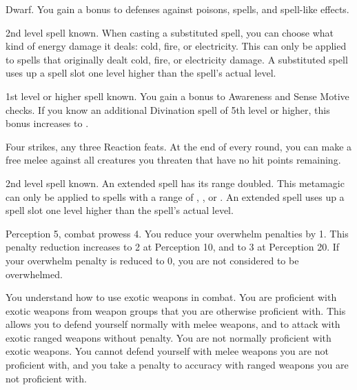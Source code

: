 \featpre Dwarf.
\featben You gain a  bonus to defenses against poisons, spells, and spell-like effects.

\featpre 2nd level spell known.
\featben When casting a substituted spell, you can choose what kind of energy damage it deals: cold, fire, or electricity.
This can only be applied to spells that originally dealt cold, fire, or electricity damage.
A substituted spell uses up a spell slot one level higher than the spell's actual level.

\featpre 1st level or higher  spell known.
\featben You gain a  bonus to Awareness and Sense Motive checks.
If you know an additional Divination spell of 5th level or higher, this bonus increases to .

\featpres Four strikes, any three Reaction feats.
\featben At the end of every round, you can make a free melee  against all creatures you threaten that have no hit points remaining.

\featpre 2nd level spell known.
\featben An extended spell has its range doubled.
This metamagic can only be applied to spells with a range of \rngclose, \rngmed, or \rnglong.
An extended spell uses up a spell slot one level higher than the spell's actual level.

\featpre Perception 5, combat prowess 4.
\featben You reduce your overwhelm penalties by 1.
This penalty reduction increases to 2 at Perception 10, and to 3 at Perception 20.
If your overwhelm penalty is reduced to 0, you are not considered to be overwhelmed.

You understand how to use exotic weapons in combat.
\featben You are proficient with exotic weapons from weapon groups that you are otherwise proficient with.
This allows you to defend yourself normally with melee weapons, and to attack with exotic ranged weapons without penalty.
You are not normally proficient with exotic weapons.
You cannot defend yourself with melee weapons you are not proficient with, and you take a  penalty to accuracy with ranged weapons you are not proficient with.

